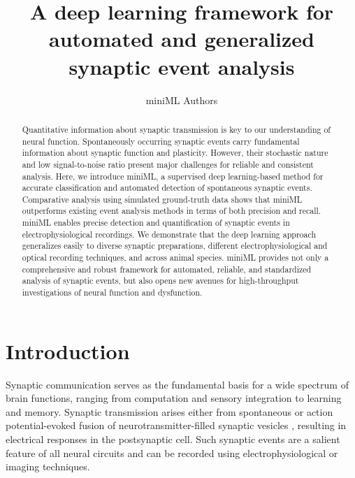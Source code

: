 \documentclass[9pt,lineno]{article}
\title{A deep learning framework for automated and generalized synaptic event analysis}
\author[1]{miniML Authors}
\affil[1]{Department of Molecular Life Sciences, University of Zurich, Switzerland}
\date{}
\begin{document}
\maketitle

\begin{abstract}
Quantitative information about synaptic transmission is key to our understanding of neural function. Spontaneously occurring synaptic events carry fundamental information about synaptic function and plasticity. However, their stochastic nature and low signal-to-noise ratio present major challenges for reliable and consistent analysis. Here, we introduce miniML, a supervised deep learning-based method for accurate classification and automated detection of spontaneous synaptic events. Comparative analysis using simulated ground-truth data shows that miniML outperforms existing event analysis methods in terms of both precision and recall. miniML enables precise detection and quantification of synaptic events in electrophysiological recordings. We demonstrate that the deep learning approach generalizes easily to diverse synaptic preparations, different electrophysiological and optical recording techniques, and across animal species. miniML provides not only a comprehensive and robust framework for automated, reliable, and standardized analysis of synaptic events, but also opens new avenues for high-throughput investigations of neural function and dysfunction.
\end{abstract}

\section{Introduction}

Synaptic communication serves as the fundamental basis for a wide spectrum of brain functions, ranging from computation and sensory integration to learning and memory. Synaptic transmission arises either from spontaneous or action potential-evoked fusion of neurotransmitter-filled synaptic vesicles \citep{KaeserRegehr2014}, resulting in electrical responses in the postsynaptic cell. Such synaptic events are a salient feature of all neural circuits and can be recorded using electrophysiological or imaging techniques.
\end{document}
